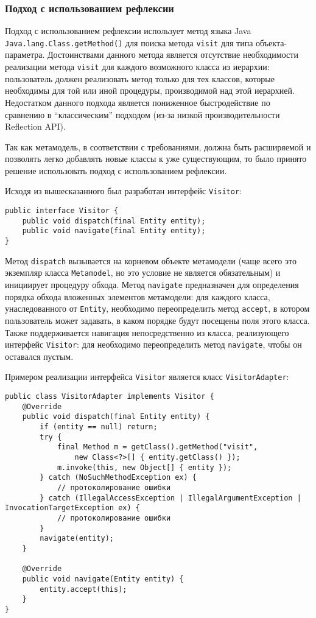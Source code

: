 \subsubsection{Подход с использованием рефлексии}

Подход с использованием рефлексии использует метод языка Java
\texttt{Java.lang.Class.getMethod()} для поиска метода \texttt{visit} для
типа объекта-параметра. Достоинствами данного метода является отсутствие
необходимости реализации метода \texttt{visit} для каждого возможного класса из
иерархии: пользователь должен реализовать метод только для тех классов, которые
необходимы для той или иной процедуры, производимой над этой иерархией.
Недостатком данного подхода является пониженное быстродействие по сравнению в
``классическим'' подходом (из-за низкой производительности Reflection API).

Так как метамодель, в соответствии с требованиями, должна быть расширяемой и
позволять легко добавлять новые классы к уже существующим, то было принято
решение использовать подход с использованием рефлексии.

Исходя из вышесказанного был разработан интерфейс \texttt{Visitor}:

\begin{lstlisting}[caption={Базовый класс для обхода метамодели}]
public interface Visitor {
    public void dispatch(final Entity entity);
    public void navigate(final Entity entity);
}
\end{lstlisting}

Метод \texttt{dispatch} вызывается на корневом объекте метамодели (чаще всего
это экземпляр класса \texttt{Metamodel}, но это условие не является
обязательным) и инициирует процедуру обхода. Метод \texttt{navigate}
предназначен для определения порядка обхода вложенных элементов метамодели: для
каждого класса, унаследованного от \texttt{Entity}, необходимо переопределить
метод \texttt{accept}, в котором пользователь может задавать, в каком порядке
будут посещены поля этого класса. Также поддерживается навигация
непосредственно из класса, реализующего интерфейс \texttt{Visitor}: для
необходимо переопределить метод \texttt{navigate}, чтобы он оставался пустым.

Примером реализации интерфейса \texttt{Visitor} является класс
\texttt{VisitorAdapter}:

\begin{lstlisting}[caption={Реализация интерфейса Visitor}]
public class VisitorAdapter implements Visitor {
    @Override
    public void dispatch(final Entity entity) {
        if (entity == null) return;
        try {
            final Method m = getClass().getMethod("visit",
                new Class<?>[] { entity.getClass() });
            m.invoke(this, new Object[] { entity });
        } catch (NoSuchMethodException ex) {
            // протоколирование ошибки
        } catch (IllegalAccessException | IllegalArgumentException | InvocationTargetException ex) {
            // протоколирование ошибки
        }
        navigate(entity);
    }

    @Override
    public void navigate(Entity entity) {
        entity.accept(this);
    }
}
\end{lstlisting}

